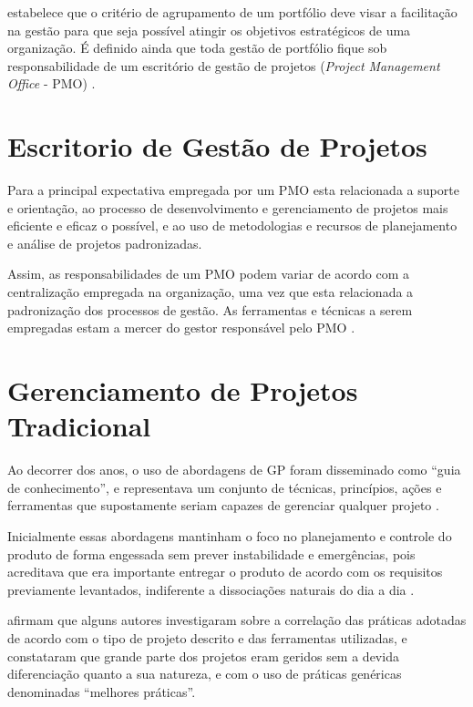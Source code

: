  estabelece que o critério de agrupamento de um portfólio deve visar a facilitação na gestão para que seja possível atingir os objetivos estratégicos de uma organização. É definido ainda que toda gestão de portfólio fique sob responsabilidade de um escritório de gestão de projetos (\textit{Project Management Office} - PMO)  .


\section{Escritorio de Gestão de Projetos}

Para  a principal expectativa empregada por um PMO esta relacionada a suporte e orientação, ao processo de desenvolvimento e gerenciamento de projetos mais eficiente e eficaz o possível, e ao uso de metodologias e recursos de planejamento e análise de projetos padronizadas.

Assim, as responsabilidades de um PMO podem variar de acordo com a centralização empregada na organização, uma vez que esta relacionada a padronização dos processos de gestão. As ferramentas e técnicas a serem empregadas estam a mercer do gestor responsável pelo PMO \cite{pmiguide2001}.

\section{Gerenciamento de Projetos Tradicional}

Ao decorrer dos anos, o uso de abordagens de GP foram disseminado como “guia de conhecimento”, e representava um conjunto de técnicas, princípios, ações e ferramentas que supostamente seriam capazes de gerenciar qualquer projeto \cite{kolltveit2007perspectives, shenhar2007reinventing}.

Inicialmente essas abordagens mantinham o foco no planejamento e controle do produto de forma engessada sem prever instabilidade e emergências, pois acreditava que era importante entregar o produto de acordo com os requisitos previamente levantados, indiferente a dissociações naturais do dia a dia \cite{winter2006directions}.

 afirmam que alguns autores investigaram sobre a correlação das práticas adotadas de acordo com o tipo de projeto descrito e das ferramentas utilizadas, e constataram que grande parte dos projetos eram geridos sem a devida diferenciação quanto a sua natureza, e com o uso de práticas genéricas denominadas “melhores práticas”.

